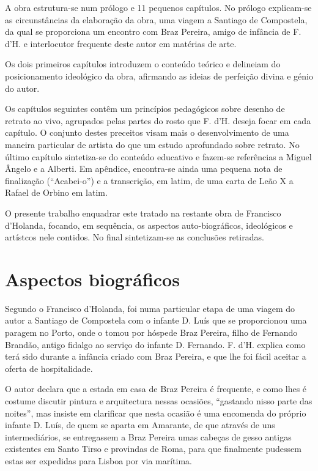 \documentclass{article}
\begin{document}
A obra estrutura-se num prólogo e 11 pequenos capítulos. No prólogo
explicam-se as circunstâncias da elaboração da obra, uma viagem a
Santiago de Compostela, da qual se proporciona um encontro com Braz
Pereira, amigo de infância de F. d'H. e interlocutor frequente deste
autor em matérias de arte.

Os dois primeiros capítulos introduzem o conteúdo teórico e delineiam
do posicionamento ideológico da obra, afirmando as ideias de perfeição
divina e génio do autor.

Os capítulos seguintes contêm um princípios pedagógicos sobre desenho
de retrato ao vivo, agrupados pelas partes do rosto que F. d'H. deseja
focar em cada capítulo. O conjunto destes preceitos visam mais o
desenvolvimento de uma maneira particular de artista do que um estudo
aprofundado sobre retrato. No último capítulo sintetiza-se do conteúdo
educativo e fazem-se referências a Miguel Ângelo e a Alberti. Em
apêndice, encontra-se ainda uma pequena nota de finalização
(``Acabei-o'') e a transcrição, em latim, de uma carta de Leão X a Rafael de
Orbino em latim.

O presente trabalho enquadrar este tratado na restante obra de
Francisco d'Holanda, focando, em sequência, os aspectos
auto-biográficos, ideológicos e artístcos nele contidos. No final
sintetizam-se as conclusões retiradas.

\section{Aspectos biográficos}

Segundo o Francisco d'Holanda, foi numa particular etapa de uma viagem
do autor a Santiago de Compostela com o infante D. Luís que se
proporcionou uma paragem no Porto, onde o tomou por hóspede Braz
Pereira, filho de Fernando Brandão, antigo fidalgo ao serviço do
infante D. Fernando. F. d'H. explica como terá sido durante a infância
criado com Braz Pereira, e que lhe foi fácil aceitar a oferta de
hospitalidade.

O autor declara que a estada em casa de Braz Pereira é frequente, e
como lhes é costume discutir pintura e arquitectura nessas ocasiões,
``gastando nisso parte das noites'', mas insiste em clarificar que
nesta ocasião é uma encomenda do próprio infante D. Luís, de quem se
aparta em Amarante, de que através de uns intermediários, se
entregassem a Braz Pereira umas cabeças de gesso antigas existentes em
Santo Tirso e provindas de Roma, para que finalmente pudessem estas
ser expedidas para Lisboa por via marítima.
\end{document}
